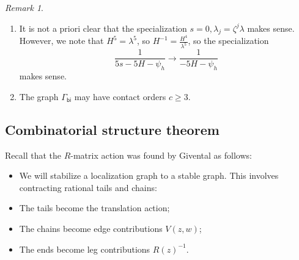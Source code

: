 \documentclass[10pt,oldfontcommands,oneside]{memoir}
\theoremstyle{definition}
\theoremstyle{remark}
\newtheorem{rmk}[thm]{Remark}
\theoremstyle{plain}
\theoremstyle{definition}
\theoremstyle{remark}
\newcommand{\ms}[1]{\mathsf{#1}}
\newcommand{\1}{\mathbf{1}}
\newcommand{\2}{\mathbf{2}}
\newcommand{\3}{\mathbf{3}}
\begin{document}
\begin{rmk}\leavevmode
    \begin{enumerate}
        \item It is not a priori clear that the specialization $s=0, \lambda_j = \zeta^j \lambda$ makes sense. However, we note that $H^5 = \lambda^5$, so $H^{-1} = \frac{H^4}{\lambda^5}$, so the specialization
            \[ \frac{1}{5s - 5H - \psi_h} \to \frac{1}{-5H - \psi_h} \]
            makes sense.
        \item The graph $\Gamma_{\ms{bi}}$ may have contact orders $c \geq 3$.
    \end{enumerate}
\end{rmk}

\subsection{Combinatorial structure theorem}%
\label{sub:Combinatorial structure theorem}

Recall that the $R$-matrix action was found by Givental as follows:
\begin{itemize}
    \item We will stabilize a localization graph to a stable graph. This involves contracting rational tails and chains:
    \item The tails become the translation action;
    \item The chains become edge contributions $V(z,w)$;
    \item The ends become leg contributions $R(z)^{-1}$.
\end{itemize}
\end{document}
